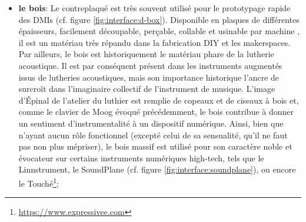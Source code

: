 \begin{itemize}[noitemsep]
	\item \textbf{le bois}: Le contreplaqué est très souvent utilisé pour le prototypage rapide des \glspl{DMI} (cf. figure \ref{fig:interface:d-box}). Disponible en plaques de différentes épaisseurs, facilement découpable, perçable, collable et usinable par machine , il est un matériau très répandu dans la fabrication \gls{DIY} et les \glspl{makerspace}. Par ailleurs, le bois est historiquement le matériau phare de la lutherie acoustique. Il est par conséquent présent dans les instruments augmentés issus de lutheries acoustiques, mais son importance historique l'ancre de surcroît dans l'imaginaire collectif de l'instrument de musique. L'image d'Épinal de l'atelier du luthier est remplie de copeaux et de ciseaux à bois et, comme le clavier de Moog évoqué précédemment, le bois contribue à donner un sentiment d'instrumentalité à un dispositif numérique. Ainsi, bien que n'ayant aucun rôle fonctionnel (excepté celui de sa sensualité, qu'il ne faut pas non plus mépriser), le bois massif est utilisé pour son caractère noble et évocateur sur certains instruments numériques high-tech, tels que le Linnstrument, le SoundPlane (cf. figure \ref{fig:interface:soundplane}), ou encore le Touché\footnote{\url{https://www.expressivee.com}};
	\begin{figure}[!htbp]
\end{figure}
\end{itemize}

